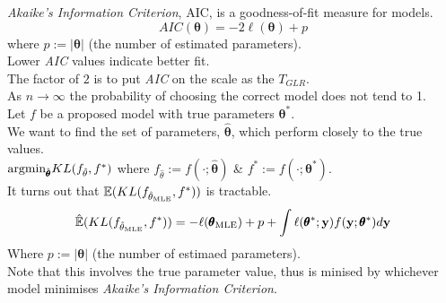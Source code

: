 \documentclass[11pt,a4paper]{article}
\begin{document}
\textit{Akaike's Information Criterion}, AIC, is a goodness-of-fit measure for models.
$$AIC(\pmb\theta)=-2\ell(\pmb\theta)+p$$
where $p:=|\pmb\theta|$ (the number of estimated parameters).\\
Lower \textit{AIC} values indicate better fit.\\
\nb The factor of $2$ is to put \textit{AIC} on the scale as the $T_{GLR}$.\\

As $n\to\infty$ the probability of choosing the correct model does not tend to 1.\\

Let $f$ be a proposed model with true parameters $\pmb\theta^*$.\\
We want to find the set of parameters, $\hat{\pmb\theta}$, which perform closely to the true values.\\
\ie $\text{argmin}_{\hat{\pmb\theta}}KL(f_{\hat\theta},f^*)$ where $f_{\hat\theta}:=f(\cdot;\hat{\pmb\theta})$ \& $f^*:=f(\cdot;\pmb\theta^*)$.\\
It turns out that $\mathbb{E}(KL(f_{\hat\theta_\text{MLE}},f^*))$ is tractable.
$$\hat{\mathbb{E}}(KL(f_{\hat\theta_\text{MLE}},f^*))=-\ell(\pmb\theta_\text{MLE})+p+\int\ell(\pmb\theta^*;\textbf{y})f(\textbf{y};\pmb\theta^*)d\textbf{y}$$
Where $p:=|\pmb\theta|$ (the number of estimaed parameters).\\
Note that this involves the true parameter value, thus is minised by whichever model minimises \textit{Akaike's Information Criterion}.\\
\end{document}
